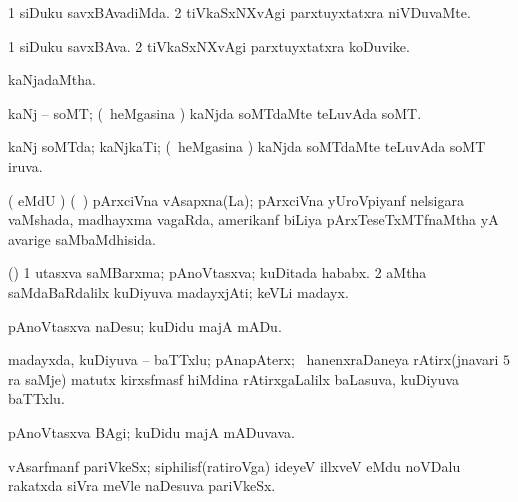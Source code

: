 {\bentry
{} 
\gl{\kirxvi}
\expl{}
\bmng
\bnum
\num{1} siDuku savxBAvadiMda. 
\num{2} tiVkaSxNXvAgi parxtuyxtatxra niVDuvaMte. 
\enum
\emng
\eentry

\bentry
{} 
\gl{\nA}
\expl{}
\bmng
\bnum
\num{1} siDuku savxBAva. 
\num{2} tiVkaSxNXvAgi parxtuyxtatxra koDuvike. 
\enum
\emng
\eentry

\bentry
{} 
\gl{\gu}
\expl{}
\bmng
kaNjadaMtha. 
\emng
\eentry

\bentry
{} 
\gl{\nA}
\expl{}
\bmng
kaNj -- soMT; (\kanmu\ heMgasina \vi) kaNjda soMTdaMte teLuvAda soMT. 
\emng
\eentry

\bentry
{} 
\gl{\gu}
\expl{}
\bmng
kaNj soMTda; kaNjkaTi; (\kanmu\ heMgasina \vi) kaNjda soMTdaMte teLuvAda soMT iruva. 
\emng
\eentry

\bentry
{} 
\gl{\gu}
\expl{}
\bmng
( eMdU \parx) (\sA\ \hiV) pArxciVna vAsapxna(La); pArxciVna yUroVpiyanf nelsigara vaMshada, madhayxma vagaRda, amerikanf biLiya pArxTeseTxMTfnaMtha yA avarige saMbaMdhisida. 
\emng
\eentry

\bentry
{} 
\gl{\nA}
\expl{}
\bmng
(\pArxparx) 
\bnum
\num{1} utasxva saMBarxma; pAnoVtasxva; kuDitada hababx. 
\num{2} aMtha saMdaBaRdalilx kuDiyuva madayxjAti; keVLi madayx. 
\enum
\emng
\eentry

\bentry
{} 
\gl{\akirx}
\expl{}
\bmng
pAnoVtasxva naDesu; kuDidu majA mADu. 
\emng
\eentry

\bentry
{} 
\gl{\nA}
\expl{}
\bmng
madayxda, kuDiyuva -- baTTxlu; pAnapAterx; \kanmu\ hanenxraDaneya rAtirx(jnavari $5$ra saMje) matutx kirxsfmasf hiMdina rAtirxgaLalilx baLasuva, kuDiyuva baTTxlu. 
\emng
\eentry

\bentry
{} 
\gl{\nA}
\expl{}
\bmng
{} 
\emng
\eentry

\bentry
{} 
\gl{\nA}
\expl{}
\bmng
pAnoVtasxva BAgi; kuDidu majA mADuvava. 
\emng
\eentry

\bentry
{} 
\gl{\nA}
\expl{}
\bmng
{} 
\emng
\eentry

\bentry
{} 
\gl{\nA}
\expl{}
\bmng
vAsarfmanf pariVkeSx; siphilisf(ratiroVga) ideyeV illxveV eMdu noVDalu rakatxda siVra meVle naDesuva pariVkeSx. 
\emng
\eentry

}
